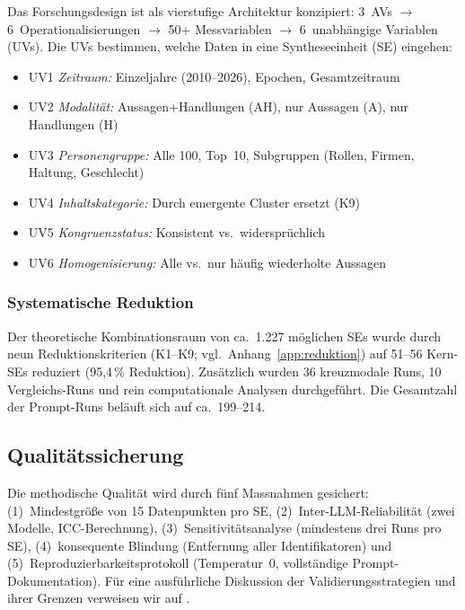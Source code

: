 \documentclass[12pt,a4paper]{article}
\begin{document}
Das Forschungsdesign ist als vierstufige Architektur konzipiert: 3~AVs $\to$ 6~Operationalisierungen $\to$ 50+ Messvariablen $\to$ 6~unabh\"angige Variablen (UVs). Die UVs bestimmen, welche Daten in eine Syntheseeinheit (SE) eingehen:

\begin{itemize}[nosep]
  \item UV1 \emph{Zeitraum:} Einzeljahre (2010--2026), Epochen, Gesamtzeitraum
  \item UV2 \emph{Modalit\"at:} Aussagen+Handlungen (AH), nur Aussagen (A), nur Handlungen (H)
  \item UV3 \emph{Personengruppe:} Alle 100, Top~10, Subgruppen (Rollen, Firmen, Haltung, Geschlecht)
  \item UV4 \emph{Inhaltskategorie:} Durch emergente Cluster ersetzt (K9)
  \item UV5 \emph{Kongruenzstatus:} Konsistent vs.\ widerspr\"uchlich
  \item UV6 \emph{Homogenisierung:} Alle vs.\ nur h\"aufig wiederholte Aussagen
\end{itemize}

\subsubsection{Systematische Reduktion}

Der theoretische Kombinationsraum von ca.\ 1.227 m\"oglichen SEs wurde durch neun Reduktionskriterien (K1--K9; vgl.\ Anhang~\ref{app:reduktion}) auf 51--56 Kern-SEs reduziert (95,4\,\% Reduktion). Zus\"atzlich wurden 36 kreuzmodale Runs, 10 Vergleichs-Runs und rein computationale Analysen durchgef\"uhrt. Die Gesamtzahl der Prompt-Runs bel\"auft sich auf ca.\ 199--214.


\subsection{Qualit\"atssicherung}
\label{sec:methodik:qualitaet}

Die methodische Qualit\"at wird durch f\"unf Massnahmen gesichert: (1)~Mindestgr\"o\ss{}e von 15 Datenpunkten pro SE, (2)~Inter-LLM-Reliabilit\"at (zwei Modelle, ICC-Berechnung), (3)~Sensitivit\"atsanalyse (mindestens drei Runs pro SE), (4)~konsequente Blindung (Entfernung aller Identifikatoren) und (5)~Reproduzierbarkeitsprotokoll (Temperatur~0, vollst\"andige Prompt-Dokumentation). F\"ur eine ausf\"uhrliche Diskussion der Validierungsstrategien und ihrer Grenzen verweisen wir auf \citet{Geiger2026SWR}.
\end{document}
